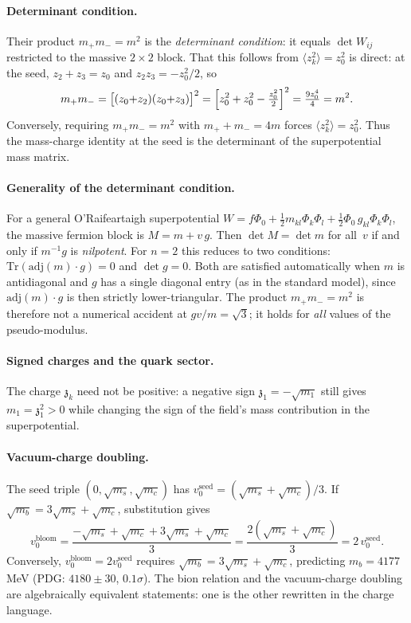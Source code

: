 \documentclass[12pt,a4paper]{article}
\newcommand{\zch}{\mathfrak{z}}
\begin{document}
\paragraph{Determinant condition.}
Their product
$m_+m_- = m^2$ is the \emph{determinant condition}: it equals
$\det W_{ij}$ restricted to the massive $2\times 2$ block.
That this follows from $\langle z_k^2\rangle = z_0^2$
is direct: at the seed, $z_2+z_3=z_0$ and
$z_2 z_3 = -z_0^2/2$, so
\begin{equation}
  m_+ m_- = \bigl[(z_0{+}z_2)(z_0{+}z_3)\bigr]^2
  = \Bigl[z_0^2 + z_0^2 - \tfrac{z_0^2}{2}\Bigr]^2
  = \tfrac{9z_0^4}{4}
  = m^2.
\end{equation}
Conversely, requiring $m_+m_-=m^2$ with $m_++m_-=4m$ forces
$\langle z_k^2\rangle = z_0^2$.
Thus the mass-charge identity at the seed is the determinant of the
superpotential mass matrix.

\paragraph{Generality of the determinant condition.}
For a general O'Raifeartaigh superpotential
$W = f\Phi_0 + \frac{1}{2}m_{kl}\Phi_k\Phi_l
+ \frac{1}{2}\Phi_0\,g_{kl}\Phi_k\Phi_l$,
the massive fermion block is $M = m + v\,g$.
Then $\det M = \det m$ for all~$v$ if and only if $m^{-1}g$ is
\emph{nilpotent}. For $n=2$ this reduces to two conditions:
$\mathrm{Tr}(\mathrm{adj}(m)\cdot g) = 0$ and $\det g = 0$.
Both are satisfied automatically when $m$ is antidiagonal
and $g$ has a single diagonal entry (as in the standard model),
since $\mathrm{adj}(m)\cdot g$ is then strictly lower-triangular.
The product $m_+m_- = m^2$ is therefore not a numerical accident
at $gv/m = \sqrt{3}$; it holds for \emph{all} values of the
pseudo-modulus.

\paragraph{Signed charges and the quark sector.}
The charge $\zch_k$ need not be positive: a negative sign
$\zch_1 = -\sqrt{m_1}$ still gives $m_1 = \zch_1^2>0$
while changing the sign of the field's mass contribution in the
superpotential.

\paragraph{Vacuum-charge doubling.}
The seed triple $(0,\sqrt{m_s},\sqrt{m_c})$ has
$v_0^{\text{seed}} = (\sqrt{m_s}+\sqrt{m_c})/3$.
If $\sqrt{m_b} = 3\sqrt{m_s}+\sqrt{m_c}$, substitution gives
\begin{equation}\label{eq:v0-doubling}
  v_0^{\text{bloom}}
  = \frac{-\sqrt{m_s}+\sqrt{m_c}+3\sqrt{m_s}+\sqrt{m_c}}{3}
  = \frac{2(\sqrt{m_s}+\sqrt{m_c})}{3}
  = 2\,v_0^{\text{seed}}.
\end{equation}
Conversely, $v_0^{\text{bloom}}=2v_0^{\text{seed}}$ requires
$\sqrt{m_b}=3\sqrt{m_s}+\sqrt{m_c}$,
predicting $m_b = 4177$\,MeV (PDG: $4180\pm30$, $0.1\sigma$).
The bion relation and the vacuum-charge doubling are
algebraically equivalent statements: one is the other rewritten in the
charge language.
\end{document}
